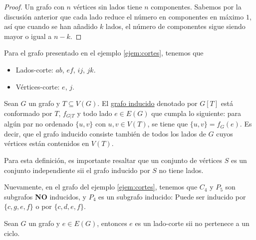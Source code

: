 \begin{proof}
    Un grafo con $n$ vértices sin lados tiene $n$ componentes. Sabemos por la discusión anterior que cada lado reduce el número en componentes en máximo $1$, así que cuando se han añadido $k$ lados, el número de componentes sigue siendo mayor o igual a $n-k$.
\end{proof}

\begin{ejem}
    Para el grafo presentado en el ejemplo \ref{ejem:cortes}, tenemos que
    
    \begin{itemize}
        \item Lados-corte: $ab$, $ef$, $ij$, $jk$.
        \item Vértices-corte: $e$, $j$.
    \end{itemize}
\end{ejem}

\begin{defn}
    Sean $G$ un grafo y $T \subseteq V(G)$. El \ul{grafo inducido} denotado por $G[T]$ está conformado por $T$, $f_{G|T}$ y todo lado $e \in E(G)$ que cumpla lo siguiente: para algún par no ordenado $\{u,v\}$ con $u,v \in V(T)$, se tiene que $\{u,v\} = f_G(e)$. Es decir, que el grafo inducido consiste también de todos los lados de $G$ cuyos vértices están contenidos en $V(T)$.
\end{defn}

Para esta definición, es importante resaltar que un conjunto de vértices $S$ es un conjunto independiente sii el grafo inducido por $S$ no tiene lados.

\begin{ejem}
    Nuevamente, en el grafo del ejemplo \ref{ejem:cortes}, tenemos que $C_4$ y $P_5$ son subgrafos \textbf{NO} inducidos, y $P_4$ es un subgrafo inducido: Puede ser inducido por $\{c,g,e,f\}$ o por $\{c,d,e,f\}$.
\end{ejem}

\begin{teo}
    Sean $G$ un grafo y $e \in E(G)$, entonces $e$ es un lado-corte sii no pertenece a un ciclo.
\end{teo}

